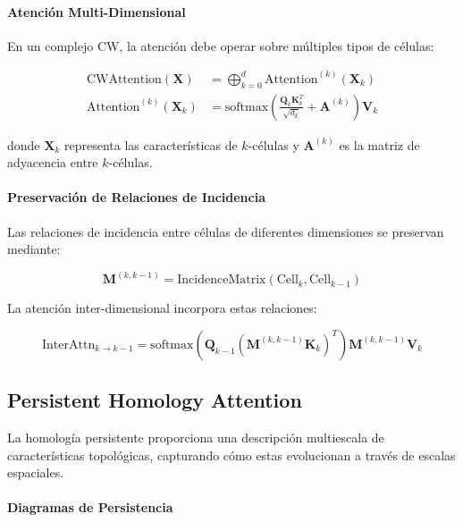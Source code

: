\paragraph{Atención Multi-Dimensional}

En un complejo CW, la atención debe operar sobre múltiples tipos de células:

\begin{align}
\text{CWAttention}(\mathbf{X}) &= \bigoplus_{k=0}^{d} \text{Attention}^{(k)}(\mathbf{X}_k) \label{eq:cw_attention} \\
\text{Attention}^{(k)}(\mathbf{X}_k) &= \text{softmax}\left(\frac{\mathbf{Q}_k \mathbf{K}_k^T}{\sqrt{d_k}} + \mathbf{A}^{(k)}\right) \mathbf{V}_k
\end{align}

donde $\mathbf{X}_k$ representa las características de $k$-células y $\mathbf{A}^{(k)}$ es la matriz de adyacencia entre $k$-células.

\paragraph{Preservación de Relaciones de Incidencia}

Las relaciones de incidencia entre células de diferentes dimensiones se preservan mediante:

\begin{equation}
\mathbf{M}^{(k,k-1)} = \text{IncidenceMatrix}(\text{Cell}_k, \text{Cell}_{k-1})
\label{eq:incidence_preservation}
\end{equation}

La atención inter-dimensional incorpora estas relaciones:

\begin{equation}
\text{InterAttn}_{k \to k-1} = \text{softmax}(\mathbf{Q}_{k-1} (\mathbf{M}^{(k,k-1)} \mathbf{K}_k)^T) \mathbf{M}^{(k,k-1)} \mathbf{V}_k
\label{eq:inter_dimensional_attention}
\end{equation}

\subsection{Persistent Homology Attention}

La homología persistente proporciona una descripción multiescala de características topológicas, capturando cómo estas evolucionan a través de escalas espaciales.

\paragraph{Diagramas de Persistencia}

